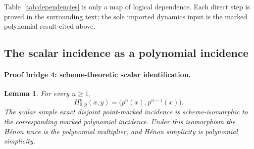 \documentclass[11pt]{article}
\newtheorem{lemma}[theorem]{Lemma}
\theoremstyle{definition}
\theoremstyle{remark}
\begin{document}
Table~\ref{tab:dependencies} is only a map of logical dependence.  Each
direct step is proved in the surrounding text; the sole imported dynamics
input is the marked polynomial result cited above.

\subsection{The scalar incidence as a polynomial incidence}

\paragraph{Proof bridge 4: scheme-theoretic scalar identification.}

\begin{lemma}
\label{lem:scalar-identification}
For every $n\geq1$,
\[
  H_{0,p}^n(x,y)=\bigl(p^n(x),p^{n-1}(x)\bigr).
\]
The scalar simple exact disjoint point-marked incidence is
scheme-isomorphic to the corresponding marked polynomial incidence.  Under
this isomorphism the Hénon trace is the polynomial multiplier, and Hénon
simplicity is polynomial simplicity.
\end{lemma}
\end{document}
